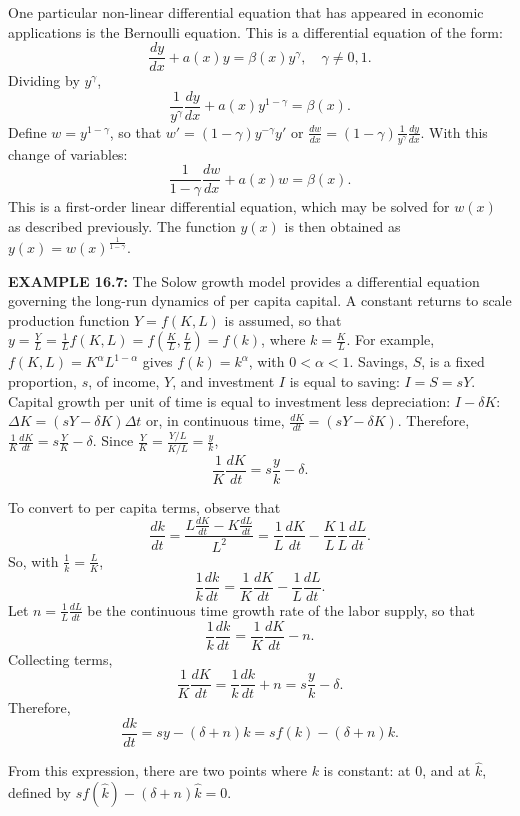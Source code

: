 \begin{original}
One particular non-linear differential equation that has appeared in economic applications is the Bernoulli equation. This is a differential equation of the form:
\[
\frac{d y}{dx} + a(x)y = \beta(x)y^{\gamma}, \quad \gamma \neq 0, 1.
\]
Dividing by $y^{\gamma}$,
\[
\frac{1}{y^{\gamma}}\frac{dy}{dx} + a(x) y^{1-\gamma} = \beta(x).
\]
Define $w = y^{1-\gamma}$, so that $w' = (1 - \gamma) y^{-\gamma} y'$ or $\frac{dw}{dx} = (1 - \gamma) \frac{1}{y^{\gamma}}\frac{dy}{dx}$. With this change of variables:
\[
\frac{1}{1 - \gamma}\frac{dw}{dx} + a(x)w = \beta(x).
\]
This is a first-order linear differential equation, which may be solved for $w(x)$ as described previously. The function $y(x)$ is then obtained as $y(x) = w(x)^{\frac{1}{1-\gamma}}$.

\textbf{EXAMPLE 16.7:} The Solow growth model provides a differential equation governing the long-run dynamics of per capita capital. A constant returns to scale production function $Y = f(K, L)$ is assumed, so that $y = \frac{Y}{L} = \frac{1}{L}f(K, L) = f(\frac{K}{L}, \frac{L}{L}) = f(k)$, where $k = \frac{K}{L}$. For example, $f(K, L) = K^{\alpha} L^{1-\alpha}$ gives $f(k) = k^{\alpha}$, with $0 < \alpha < 1$. Savings, $S$, is a fixed proportion, $s$, of income, $Y$, and investment $I$ is equal to saving: $I = S = sY$. Capital growth per unit of time is equal to investment less depreciation: $I - \delta K$: $\Delta K = (sY - \delta K)\Delta t$ or, in continuous time, $\frac{dK}{dt} = (sY - \delta K)$. Therefore, $\frac{1}{K}\frac{dK}{dt} = s\frac{Y}{K} - \delta$. Since $\frac{Y}{K} = \frac{Y/L}{K/L} = \frac{y}{k}$,
\[
\frac{1}{K}\frac{dK}{dt} = s\frac{y}{k} - \delta.
\]

To convert to per capita terms, observe that
\[
\frac{dk}{dt} = \frac{L\frac{dK}{dt} - K\frac{dL}{dt}}{L^2} = \frac{1}{L}\frac{dK}{dt} - \frac{K}{L}\frac{1}{L}\frac{dL}{dt}.
\]
So, with $\frac{1}{k} = \frac{L}{K}$,
\[
\frac{1}{k}\frac{dk}{dt} = \frac{1}{K}\frac{dK}{dt} - \frac{1}{L}\frac{dL}{dt}.
\]
Let $n = \frac{1}{L}\frac{dL}{dt}$ be the continuous time growth rate of the labor supply, so that
\[
\frac{1}{k}\frac{dk}{dt} = \frac{1}{K}\frac{dK}{dt} - n.
\]
Collecting terms,
\[
\frac{1}{K}\frac{dK}{dt} = \frac{1}{k}\frac{dk}{dt} + n = s\frac{y}{k} - \delta.
\]
Therefore,
\[
\frac{dk}{dt} = sy - (\delta + n)k = s f(k) - (\delta + n)k. \tag{16.16}
\]

From this expression, there are two points where $k$ is constant: at $0$, and at $\hat{k}$, defined by $s f(\hat{k}) - (\delta + n)\hat{k} = 0$.


\end{original}
